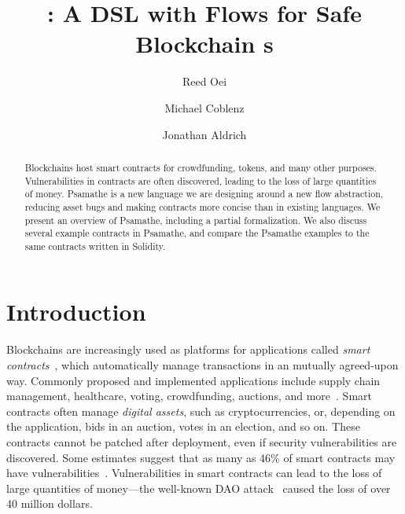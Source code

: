 \documentclass[nonacm, dvipsnames, sigconf]{acmart}
\begin{document}
\title{\langName: A DSL with Flows for Safe Blockchain \AssetTxt{}s}

\author{Reed Oei}

\author{Michael Coblenz}

\author{Jonathan Aldrich}

\begin{abstract}
Blockchains host smart contracts for crowdfunding, tokens, and many other purposes.
Vulnerabilities in contracts are often discovered, leading to the loss of large quantities of money.
Psamathe is a new language we are designing around a new flow abstraction, reducing asset bugs and making contracts more concise than in existing languages.
We present an overview of Psamathe, including a partial formalization.
We also discuss several example contracts in Psamathe, and compare the Psamathe examples to the same contracts written in Solidity.
\end{abstract}

\maketitle

\section{Introduction}
Blockchains are increasingly used as platforms for applications called \emph{smart contracts}~\cite{Szabo97:Formalizing}, which automatically manage transactions in an mutually agreed-upon way.
Commonly proposed and implemented applications include supply chain management, healthcare, voting, crowdfunding, auctions, and more~\cite{SupplyChainUse,HealthcareUse,Elsden18:Making}.
Smart contracts often manage \emph{digital assets}, such as cryptocurrencies, or, depending on the application, bids in an auction, votes in an election, and so on.
These contracts cannot be patched after deployment, even if security vulnerabilities are discovered.
Some estimates suggest that as many as 46\% of smart contracts may have vulnerabilities~\cite{luuOyente}.
Vulnerabilities in smart contracts can lead to the loss of large quantities of money---the well-known DAO attack~\cite{DAO} caused the loss of over 40 million dollars.
\end{document}

